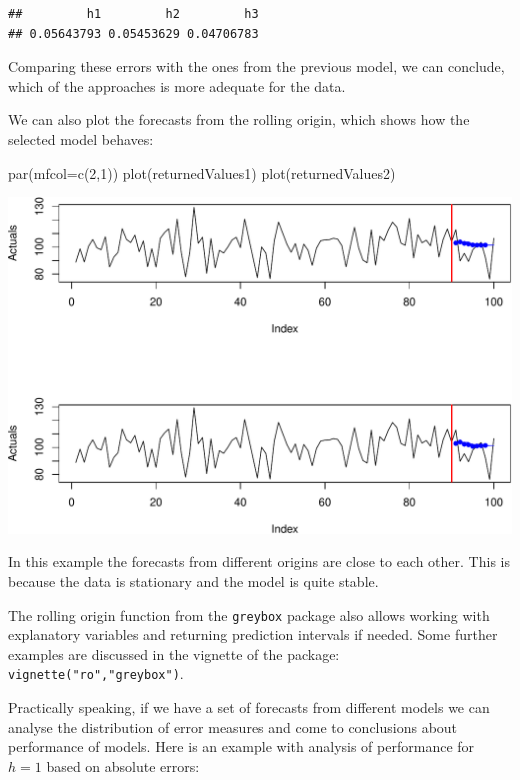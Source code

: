 \documentclass[
]{book}
\newenvironment{Shaded}{\begin{snugshade}}{\end{snugshade}}
\newcommand{\AttributeTok}[1]{\textcolor[rgb]{0.77,0.63,0.00}{#1}}
\newcommand{\DecValTok}[1]{\textcolor[rgb]{0.00,0.00,0.81}{#1}}
\newcommand{\FunctionTok}[1]{\textcolor[rgb]{0.00,0.00,0.00}{#1}}
\newcommand{\NormalTok}[1]{#1}
\theoremstyle{definition}
\theoremstyle{definition}
\theoremstyle{definition}
\theoremstyle{definition}
\theoremstyle{remark}
\begin{document}
\begin{verbatim}
##         h1         h2         h3 
## 0.05643793 0.05453629 0.04706783
\end{verbatim}

Comparing these errors with the ones from the previous model, we can conclude, which of the approaches is more adequate for the data.

We can also plot the forecasts from the rolling origin, which shows how the selected model behaves:

\begin{Shaded}
\begin{Highlighting}[]
\FunctionTok{par}\NormalTok{(}\AttributeTok{mfcol=}\FunctionTok{c}\NormalTok{(}\DecValTok{2}\NormalTok{,}\DecValTok{1}\NormalTok{))}
\FunctionTok{plot}\NormalTok{(returnedValues1)}
\FunctionTok{plot}\NormalTok{(returnedValues2)}
\end{Highlighting}
\end{Shaded}

\includegraphics{adam_files/figure-latex/unnamed-chunk-13-1.pdf}

In this example the forecasts from different origins are close to each other. This is because the data is stationary and the model is quite stable.

The rolling origin function from the \texttt{greybox} package also allows working with explanatory variables and returning prediction intervals if needed. Some further examples are discussed in the vignette of the package: \texttt{vignette("ro","greybox")}.

Practically speaking, if we have a set of forecasts from different models we can analyse the distribution of error measures and come to conclusions about performance of models. Here is an example with analysis of performance for \(h=1\) based on absolute errors:
\end{document}
